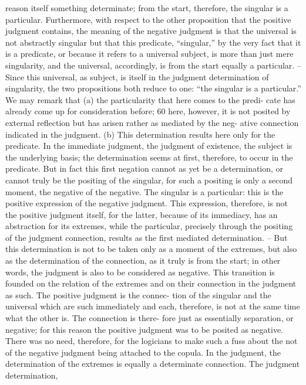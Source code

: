 reason itself something determinate; from the start, therefore, the singular
is a particular. Furthermore, with respect to the other proposition that the
positive judgment contains, the meaning of the negative judgment is that
the universal is not abstractly singular but that this predicate, “singular,” by
the very fact that it is a predicate, or because it refers to a universal subject,
is more than just mere singularity, and the universal, accordingly, is from
the start equally a particular. – Since this universal, as subject, is itself in the
judgment determination of singularity, the two propositions both reduce
to one: “the singular is a particular.”
We may remark that (a) the particularity that here comes to the predi-
cate has already come up for consideration before; 60 here, however, it is not
posited by external reflection but has arisen rather as mediated by the neg-
ative connection indicated in the judgment. (b) This determination results
here only for the predicate. In the immediate judgment, the judgment of
existence, the subject is the underlying basis; the determination seems at
first, therefore, to occur in the predicate. But in fact this first negation cannot
as yet be a determination, or cannot truly be the positing of the singular, for
such a positing is only a second moment, the negative of the negative.
The singular is a particular: this is the positive expression of the negative
judgment. This expression, therefore, is not the positive judgment itself, for
the latter, because of its immediacy, has an abstraction for its extremes, while
the particular, precisely through the positing of the judgment connection,
results as the first mediated determination. – But this determination is not
to be taken only as a moment of the extremes, but also as the determination
of the connection, as it truly is from the start; in other words, the judgment
is also to be considered as negative.
This transition is founded on the relation of the extremes and on their
connection in the judgment as such. The positive judgment is the connec-
tion of the singular and the universal which are such immediately and each,
therefore, is not at the same time what the other is. The connection is there-
fore just as essentially separation, or negative; for this reason the positive
judgment was to be posited as negative. There was no need, therefore, for
the logicians to make such a fuss about the not of the negative judgment
being attached to the copula. In the judgment, the determination of the
extremes is equally a determinate connection. The judgment determination,
